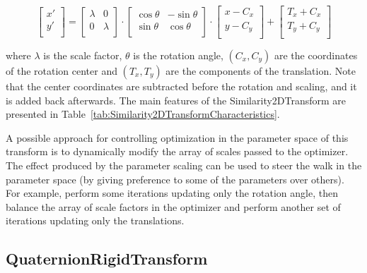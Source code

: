 \begin{equation}
\left[ 
\begin{array}{c}
x' \\
y' \\
\end{array}
\right]
=
\left[ 
\begin{array}{cc}
\lambda &    0     \\
   0    &  \lambda \\
\end{array}
\right]
\cdot
\left[ 
\begin{array}{cc}
\cos{\theta} & -\sin{\theta} \\
\sin{\theta} &  \cos{\theta} \\
\end{array}
\right]
\cdot
\left[ 
\begin{array}{c}
x - C_x \\
y - C_y \\
\end{array}
\right]
+ 
\left[ 
\begin{array}{c}
T_x + C_x \\
T_y + C_y \\
\end{array}
\right]
\end{equation}

where $\lambda$ is the scale factor, $\theta$ is the rotation angle,
$(C_x,C_y)$ are the coordinates of the rotation center and $(T_x,T_y)$ are
the components of the translation. Note that the center coordinates are
subtracted before the rotation and scaling, and it is added back afterwards.
The main features of the Similarity2DTransform are presented in
Table~\ref{tab:Similarity2DTransformCharacteristics}.


A possible approach for controlling optimization in the parameter space of
this transform is to dynamically modify the array of scales passed to the
optimizer. The effect produced by the parameter scaling can be used to steer
the walk in the parameter space (by giving preference to some of the
parameters over others). For example, perform some iterations updating only
the rotation angle, then balance the array of scale factors in the optimizer
and perform another set of iterations updating only the translations.


\subsection{QuaternionRigidTransform}
\label{sec:QuaternionRigidTransform}


